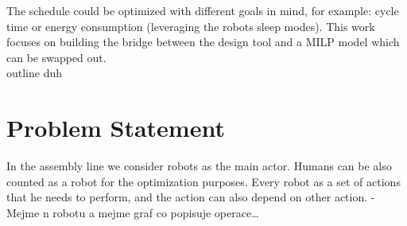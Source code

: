 The schedule could be optimized with different goals in mind, for example: cycle time or energy consumption (leveraging the robots sleep modes). This work focuses on building the bridge between the design tool and a MILP model which can be swapped out. \\


outline duh

\section{Problem Statement}

In the assembly line we consider robots as the main actor. Humans can be also counted as a robot for the optimization purposes. Every robot as a set of actions that he needs to perform, and the action can also depend on other action. 
- Mejme n robotu a mejme graf co popisuje operace\ldots 
